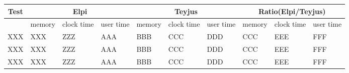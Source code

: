 \documentclass{llncs}
\begin{document}
\begin{center}

 \begin{table}
  \begin{tabular}{|p{1.1cm}||p{1.1cm}|p{1.1cm}|p{1.1cm}||p{1.1cm}|p{1.1cm}|p{1.1cm}||p{1.1cm}|p{1.1cm}|p{1.1cm}|}
    \hline
      \multicolumn{1}{|c||}{Test} &
      \multicolumn{3}{|c||}{Elpi} &
      \multicolumn{3}{|c||}{Teyjus} &
      \multicolumn{3}{|c|}{Ratio(Elpi/Teyjus)} \\
    \hline
      & memory & clock time & user time & memory & clock time & user time & memory & clock time & user time \\
    \hline
    XXX & XXX & ZZZ & AAA & BBB & CCC & DDD & CCC & EEE & FFF \\
    \hline
    XXX & XXX & ZZZ & AAA & BBB & CCC & DDD & CCC & EEE & FFF \\
    \hline
    XXX & XXX & ZZZ & AAA & BBB & CCC & DDD & CCC & EEE & FFF \\
    \hline
  \end{tabular}
 \end{table}

 \end{center}




\end{document}
